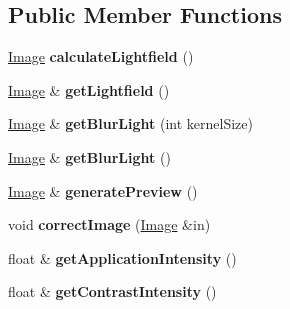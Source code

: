 \subsection*{Public Member Functions}
\begin{DoxyCompactItemize}
\item 
\hyperlink{classImage}{Image} {\bfseries calculate\+Lightfield} ()\hypertarget{classLightfieldCorrector_abbb5d0f456cd709210ae6ab1a7f30856}{}\label{classLightfieldCorrector_abbb5d0f456cd709210ae6ab1a7f30856}

\item 
\hyperlink{classImage}{Image} \& {\bfseries get\+Lightfield} ()\hypertarget{classLightfieldCorrector_a14d07f12320475f587d578c1ae0ac03a}{}\label{classLightfieldCorrector_a14d07f12320475f587d578c1ae0ac03a}

\item 
\hyperlink{classImage}{Image} \& {\bfseries get\+Blur\+Light} (int kernel\+Size)\hypertarget{classLightfieldCorrector_a1275c6d9c4ff099f6d227c925fa30cf3}{}\label{classLightfieldCorrector_a1275c6d9c4ff099f6d227c925fa30cf3}

\item 
\hyperlink{classImage}{Image} \& {\bfseries get\+Blur\+Light} ()\hypertarget{classLightfieldCorrector_aadc807f89b358c62746f5cd9b6eb7195}{}\label{classLightfieldCorrector_aadc807f89b358c62746f5cd9b6eb7195}

\item 
\hyperlink{classImage}{Image} \& {\bfseries generate\+Preview} ()\hypertarget{classLightfieldCorrector_aad927f44926eb6d3d6ba7d31c31c300f}{}\label{classLightfieldCorrector_aad927f44926eb6d3d6ba7d31c31c300f}

\item 
void {\bfseries correct\+Image} (\hyperlink{classImage}{Image} \&in)\hypertarget{classLightfieldCorrector_a13a7932eff8edd3c22404f912c5cdc87}{}\label{classLightfieldCorrector_a13a7932eff8edd3c22404f912c5cdc87}

\item 
float \& {\bfseries get\+Application\+Intensity} ()\hypertarget{classLightfieldCorrector_af3e3136dca6d960339d5a9933d3f7f89}{}\label{classLightfieldCorrector_af3e3136dca6d960339d5a9933d3f7f89}

\item 
float \& {\bfseries get\+Contrast\+Intensity} ()\hypertarget{classLightfieldCorrector_a4f204342c578de9a4f24e30f1eeb28fc}{}\label{classLightfieldCorrector_a4f204342c578de9a4f24e30f1eeb28fc}


\end{DoxyCompactItemize}
